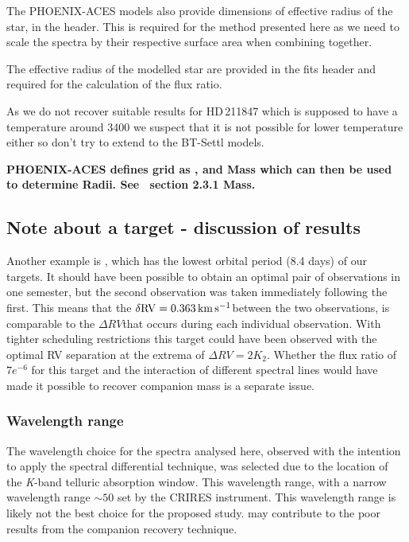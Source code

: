 The {PHOENIX-ACES} models also provide dimensions of effective radius of the star, in the header.
This is required for the method presented here as we need to scale the spectra by their respective surface area when combining together.


The effective radius of the modelled star are provided in the fits header and required for the calculation of the flux ratio.


As we do not recover suitable results for HD\,211847 which is supposed to have a temperature around 3400\K{} we suspect that it is not possible for lower temperature either so don't try to extend to the {BT-Settl} models.


\textbf{
    {PHOENIX-ACES} defines grid as \Teff{}, \logg{} and Mass which can then be used to determine Radii.
    See~\citep{husser_new_2013} section 2.3.1 Mass.}




\subsection{Note about a target - discussion of results}
Another example is , which has the lowest orbital period (8.4 days) of our targets.
It should have been possible to obtain an optimal pair of observations in one semester, but the second observation was taken immediately following the first.
This means that the \(\rm \delta {RV} = 0.363\,\si{\kilo\metre\per\second}{}\)between the two observations, is comparable to the \(\Delta {RV}\)that occurs during each individual observation.
With tighter scheduling restrictions this target could have been observed with the optimal {RV} separation at the extrema of \(\Delta {RV}=2 K_{2}\).
Whether the flux ratio of \(7e^{-6}\) for this target and the interaction of different spectral lines would have made it possible to recover companion mass is a separate issue.


\subsubsection{Wavelength range}
The wavelength choice for the spectra analysed here, observed with the intention to apply the spectral differential technique, was selected due to the location of the \emph{K}-band telluric absorption window.
This wavelength range, with a narrow wavelength range \(\sim50\)\nm{} set by the {CRIRES} instrument.
This wavelength range is likely not the best choice for the proposed study.
 may contribute to the poor results from the companion recovery technique.

